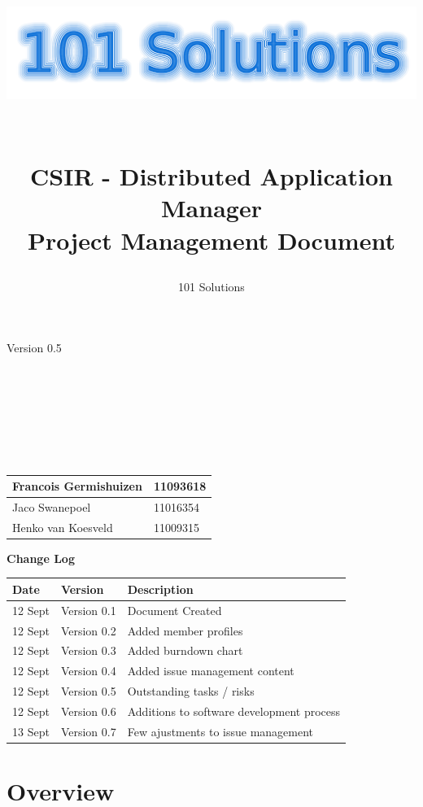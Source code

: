 \documentclass[a4paper,12pt,final]{article}
\title{
\begin{center}
  	\includegraphics[scale=0.3]{101Logo.png} 
  \end{center}
  \textbf{\\}
CSIR - Distributed Application Manager\\
Project Management Document\\
}
\author{101 Solutions}
\begin{document}
\maketitle
\begin{center}
Version 0.5
\end{center}
\textbf{\\}
\textbf{\\}
\textbf{\\}
\textbf{\\}
\textbf{\\}
\textbf{\\}
\begin{center}
\begin{tabular}{|l|l|}
\hline
Francois Germishuizen & 11093618\\
\hline
Jaco Swanepoel & 11016354\\
\hline
Henko van Koesveld & 11009315\\
\hline
\end{tabular}
\end{center}
\thispagestyle{empty}
\newpage
\thispagestyle{empty}
\textbf{\large{Change Log}}
\vspace{6pt}\newline
\begin{tabular}{|l|l|l|}
\hline
Date & Version & Description\\
\hline
12 Sept & Version 0.1 & Document Created\\
\hline
12 Sept & Version 0.2 & Added member profiles\\
\hline
12 Sept & Version 0.3 & Added burndown chart\\
\hline
12 Sept & Version 0.4 & Added issue management content\\
\hline
12 Sept & Version 0.5 & Outstanding tasks / risks\\
\hline
12 Sept & Version 0.6 & Additions to  software development process\\
\hline
13 Sept & Version 0.7 & Few ajustments to issue management\\
\hline
\end{tabular}
\newpage
\tableofcontents
\thispagestyle{empty}
\newpage

\section{Overview}
\end{document}
